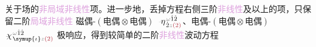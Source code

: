 关于场的\textcolor{Plum}{非局域}\textcolor{Plum}{非线性}项。进一步地，丢掉方程右侧三阶\textcolor{Plum}{非线性}及以上的项，只保留二阶\textcolor{Plum}{局域}\textcolor{Plum}{非线性} \textcolor{NavyBlue}{磁偶-$(\text{电偶}\otimes\text{电偶})$} $\xint{\begin{smallmatrix} ~ \\ {}^{}_{\mathcolor{gray}{-}} \\ ~ \end{smallmatrix}}{17}{\eta}^{\;\! \mathcolor{gray}{\omega} \hat{1} \hat{2}}_{\;\! \dot{2} \mathcolor{gray}{z} \textcolor{Maroon}{(2)}}$、\textcolor{NavyBlue}{电偶-$(\text{电偶}\otimes\text{电偶})$} $\xint{{}^{}_{\mathcolor{gray}{-}}}{23}{\chi}^{\;\! \mathcolor{gray}{\omega} \hat{1} \hat{2}}_{\;\! \symup{\iota} \mathcolor{gray}{z} \textcolor{Maroon}{(2)}}$ 极响应，得到较简单的二阶\textcolor{Plum}{非线性}波动方程

